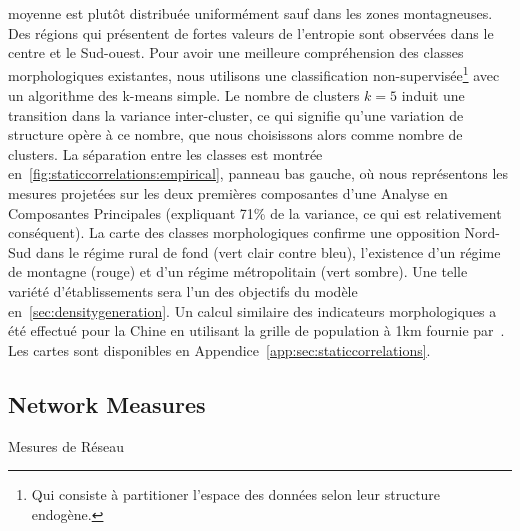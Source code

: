 {moyenne est plutôt distribuée uniformément sauf dans les zones montagneuses. Des régions qui présentent de fortes valeurs de l'entropie sont observées dans le centre et le Sud-ouest. Pour avoir une meilleure compréhension des classes morphologiques existantes, nous utilisons une classification non-supervisée\footnote{Qui consiste à partitioner l'espace des données selon leur structure endogène.} avec un algorithme des k-means simple. 
 Le nombre de clusters $k=5$ induit une transition dans la variance inter-cluster, ce qui signifie qu'une variation de structure opère à ce nombre, que nous choisissons alors comme nombre de clusters. La séparation entre les classes est montrée en~\ref{fig:staticcorrelations:empirical}, panneau bas gauche, où nous représentons les mesures projetées sur les deux premières composantes d'une Analyse en Composantes Principales (expliquant 71\% de la variance, ce qui est relativement conséquent). La carte des classes morphologiques confirme une opposition Nord-Sud dans le régime rural de fond (vert clair contre bleu), l'existence d'un régime de montagne (rouge) et d'un régime métropolitain (vert sombre). Une telle variété d'établissements sera l'un des objectifs du modèle en~\ref{sec:densitygeneration}. Un calcul similaire des indicateurs morphologiques a été effectué pour la Chine en utilisant la grille de population à 1km fournie par~\cite{fu1km}. Les cartes sont disponibles en Appendice~\ref{app:sec:staticcorrelations}.
}








\subsection{Network Measures}{Mesures de Réseau}


